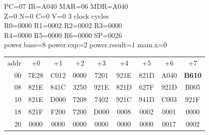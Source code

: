 \begin{tcolorbox}[stepbox, title={Step 11 \hfill PC 06 \quad CMP R1, R0}]
PC=07 IR=A040 MAR=06 MDR=A040\\
Z=0 N=0 C=0 V=0 \hfill \textcolor{dim}{3 clock cycles}\\
R0=0000 R1=0002 R2=0002 R3=0000\\
R4=0000 R5=0000 R6=0000 SP=0026\\
\textcolor{dim}{power.base=8  power.exp=2  power.result=1  main.x=0}\\[1pt]
{\setlength{\tabcolsep}{1.6pt}\begin{tabular}{@{}r*{8}{c}@{}}
\textcolor{dim}{addr} & \textcolor{dim}{+0} & \textcolor{dim}{+1} & \textcolor{dim}{+2} & \textcolor{dim}{+3} & \textcolor{dim}{+4} & \textcolor{dim}{+5} & \textcolor{dim}{+6} & \textcolor{dim}{+7}\\
\textcolor{dim}{00} & 7E28 & C012 & 0000 & 7201 & 921E & 821D & A040 & \cellcolor{pcc}\textbf{B610}\\
\textcolor{dim}{08} & 821E & 841C & 3250 & 921E & 821D & 627F & 921D & B005\\
\textcolor{dim}{10} & 821E & D000 & 7208 & 7402 & 921C & 941D & C003 & 921F\\
\textcolor{dim}{18} & 821F & F200 & 7200 & D000 & \cellcolor{datac}0008 & \cellcolor{datac}0002 & \cellcolor{datac}0001 & \cellcolor{datac}0000\\
\textcolor{dim}{20} & \cellcolor{stackc}0000 & \cellcolor{stackc}0000 & \cellcolor{stackc}0000 & \cellcolor{stackc}0000 & \cellcolor{stackc}0000 & \cellcolor{stackc}0000 & \cellcolor{stackc}0017 & \cellcolor{stackc}0002\\
\end{tabular}}
\end{tcolorbox}\par\vspace{3pt}
